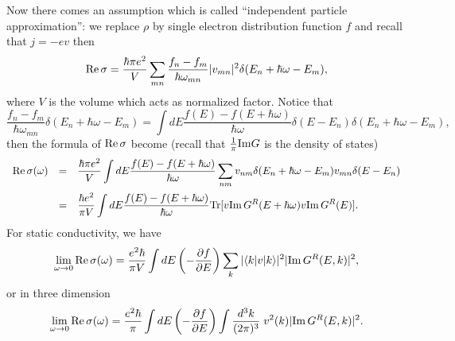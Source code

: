 \documentclass{book}
\newcommand{\bra}[1]{{\langle#1|}}
\newcommand{\ket}[1]{{|#1\rangle}}
\renewcommand{\Re}{{\rm Re}}
\renewcommand{\Im}{{\rm Im}}
\newcommand{\Tr}{{\rm Tr}}
\numberwithin{equation}{section}
\begin{document}
Now there comes an assumption which is called ``independent particle
approximation'': we replace $\rho$ by single electron distribution
function $f$ and recall that $j=-ev$ then
\begin{equation}
  \Re\,\sigma=\frac{\hbar\pi e^2}{V}\sum_{mn}
  \frac{f_n-f_m}{\hbar\omega_{mn}}|v_{mn}|^2\delta(E_n+\hbar\omega-E_m),
\end{equation}
where $V$ is the volume which acts as normalized factor.
Notice that 
\begin{equation}
  \frac{f_n-f_m}{\hbar\omega_{mn}}\delta(E_n+\hbar\omega-E_m)=
  \int dE\frac{f(E)-f(E+\hbar\omega)}{\hbar\omega}
  \delta(E-E_n)\delta(E_n+\hbar\omega-E_m),
\end{equation}
then the formula of $\Re\,\sigma$ become (recall that
$\frac{1}{\pi}\Im G$ is the density of states)
\begin{equation}
  \begin{array}{rcl}
    \Re\,\sigma(\omega)&=&\displaystyle\frac{\hbar\pi e^2}{V} \int
    dE\frac{f(E)-f(E+\hbar\omega)}{\hbar\omega}\sum_{nm}
    v_{nm}\delta(E_n+\hbar\omega-E_m)v_{mn}\delta(E-E_n)\\\vbox to
    20pt{} &=&\displaystyle\frac{\hbar e^2}{\pi V}\int dE
    \frac{f(E)-f(E+\hbar\omega)}{\hbar\omega}
    \Tr[v\Im\,G^R(E+\hbar\omega)v\Im\,G^R(E)].
  \end{array}
\end{equation}
For static conductivity, we have 
\begin{equation}
  \lim_{\omega\to0}\Re\,\sigma(\omega)=
  \frac{e^2\hbar}{\pi V}\int dE
  \left(-\frac{\partial f}{\partial E}\right)
  \sum_k|\bra{k}v\ket{k}|^2|\Im\,G^R(E,k)|^2,
\end{equation}
or in three dimension
\begin{equation}
  \lim_{\omega\to0}\Re\,\sigma(\omega)=
  \frac{e^2\hbar}{\pi}\int dE
  \left(-\frac{\partial f}{\partial E}\right)
  \int \frac{d^3k}{(2\pi)^3}\; v^2(k)|\Im\,G^R(E,k)|^2.
\end{equation}
\end{document}
